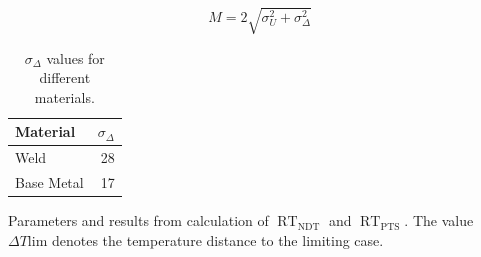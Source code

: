 \documentclass{article}
\begin{document}
    \begin{equation}
    \label{eq:m}
        M = 2\sqrt{\sigma_U^2+\sigma_\Delta^2}
    \end{equation}

    \begin{table}[htb]
    \caption{$\sigma_\Delta$ values for different materials.}
    \label{table:sigma_delta}
    \centering
    \begin{tabular}{lr}
    \toprule
    Material &  $\sigma_\Delta$ \\
    \midrule
    Weld &  28 \\
    Base Metal &  17 \\
    \bottomrule
    \end{tabular}
    \end{table}
    
    \begin{table}
    \caption{Parameters and results from calculation of $\operatorname{RT}_{\operatorname{NDT}}$ and $\operatorname{RT}_{\operatorname{PTS}}$. The value $\Delta T\text{lim}$ denotes the temperature distance to the limiting case.}
    \label{table:rt_values}
    

\end{table}
\end{document}
